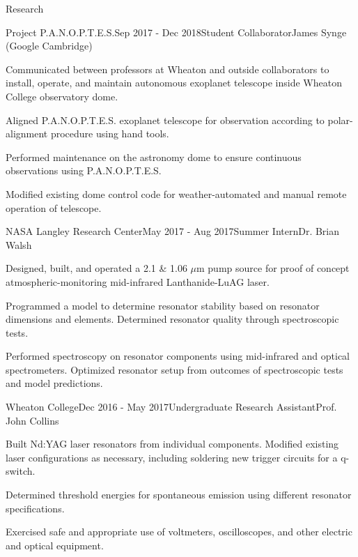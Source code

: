 \documentclass{resume} %
\begin{document}
\begin{rSection}{Research}
\begin{rSubsection}{Project P.A.N.O.P.T.E.S.}{Sep 2017 - Dec 2018}{Student Collaborator}{James Synge (Google Cambridge)}
\item Communicated between professors at Wheaton and outside collaborators to install, operate, and maintain autonomous exoplanet telescope inside Wheaton College observatory dome.
\item Aligned P.A.N.O.P.T.E.S. exoplanet telescope for observation according to polar-alignment procedure using hand tools.
\item Performed maintenance on the astronomy dome to ensure continuous observations using P.A.N.O.P.T.E.S.
\item Modified existing dome control code for weather-automated and manual remote operation of telescope.
\end{rSubsection}
\begin{rSubsection}{NASA Langley Research Center}{May 2017 - Aug 2017}{Summer Intern}{Dr. Brian Walsh}
\item Designed, built, and operated a 2.1 \& 1.06 $\mu$m pump source for proof of concept atmospheric-monitoring mid-infrared Lanthanide-LuAG laser.
\item Programmed a model to determine resonator stability based on resonator dimensions and elements. Determined resonator quality through spectroscopic tests.
\item Performed spectroscopy on resonator components using mid-infrared and optical spectrometers. Optimized resonator setup from outcomes of spectroscopic tests and model predictions.
\end{rSubsection}

\begin{rSubsection}{Wheaton College}{Dec 2016 - May 2017}{Undergraduate Research Assistant}{Prof. John Collins}
\item Built Nd:YAG laser resonators from individual components. Modified existing laser configurations as necessary, including soldering new trigger circuits for a q-switch.
\item  Determined threshold energies for spontaneous emission using different resonator specifications.
\item Exercised safe and appropriate use of voltmeters, oscilloscopes, and other electric and optical equipment.
\end{rSubsection}

\end{rSection}
\end{document}

